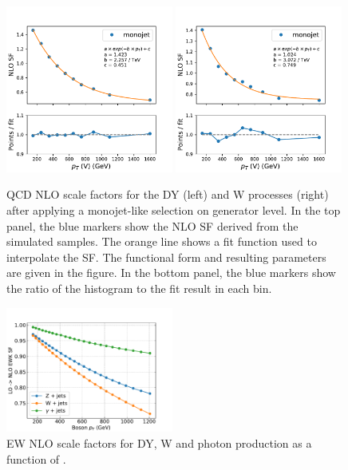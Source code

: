 \begin{figure}[ht!]
    \begin{center}
        \includegraphics[width=0.49\textwidth]{fig/theory/qcdnlo/interpolation_monojet_dy.pdf}
        \includegraphics[width=0.49\textwidth]{fig/theory/qcdnlo/interpolation_monojet_wjet.pdf}
        \caption{
            QCD NLO scale factors for the DY (left) and W processes (right) after applying a monojet-like selection on generator level.
            In the top panel, the blue markers show the NLO SF derived from the simulated samples. The orange line shows a fit function used
            to interpolate the SF. The functional form and resulting parameters are given in the figure. In the bottom panel, the blue markers
            show the ratio of the histogram to the fit result in each bin.
          }
      \label{fig:theory_sf_qcd_nlo_w_dy}
    \end{center}
  \end{figure}
\begin{figure}[ht!]
    \begin{center}
        \includegraphics[width=0.49\textwidth]{fig/theory/ewnlo/nlo_ewk.pdf}
        \caption{
            EW NLO scale factors for DY, W and photon production as a function of \ptv.
          }
      \label{fig:theory_sf_ew_nlo}
    \end{center}
  \end{figure}

